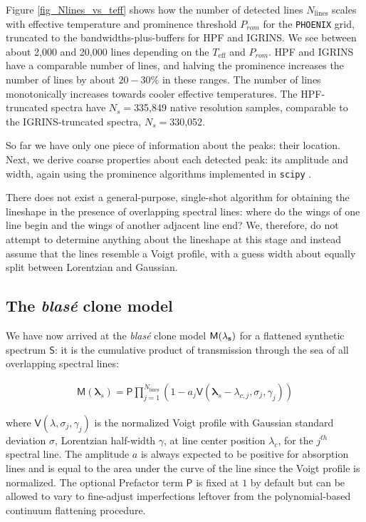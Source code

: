 \documentclass[modern]{aastex631}
\begin{document}
Figure \ref{fig_Nlines_vs_teff} shows how the number of detected lines $N_{\mathrm{lines}}$ scales with effective temperature and prominence threshold $P_{rom}$ for the \texttt{PHOENIX} grid, truncated to the bandwidths-plus-buffers for HPF and IGRINS. We see between about 2,000 and 20,000 lines depending on the $T_{\mathrm{eff}}$ and $P_{rom}$. HPF and IGRINS have a comparable number of lines, and halving the prominence increases the number of lines by about $20-30\%$ in these ranges. The number of lines monotonically increases towards cooler effective temperatures.
The HPF-truncated spectra have $N_s=$335,849 native resolution samples, comparable to the IGRINS-truncated spectra, $N_s=$330,052.

So far we have only one piece of information about the peaks: their location. Next, we derive coarse properties about each detected peak: its amplitude and width, again using the prominence algorithms implemented in \texttt{scipy} \citep{2020SciPy-NMeth}.

There does not exist a general-purpose, single-shot algorithm for obtaining the lineshape in the presence of overlapping spectral lines: where do the wings of one line begin and the wings of another adjacent line end? We, therefore, do not attempt to determine anything about the lineshape at this stage and instead assume that the lines resemble a Voigt profile, with a guess width about equally split between Lorentzian and Gaussian.

\subsection{The \emph{blas\'e} clone model}

We have now arrived at the \emph{blas\'e} clone model $\mathsf{M}(\bf{\lambda}_s)$ for a flattened synthetic spectrum $\mathsf{S}$: it is the cumulative product of transmission through the sea of all overlapping spectral lines:

\begin{eqnarray}
 \mathsf{M}(\bm{\lambda}_s) = {\displaystyle \mathsf{P} \prod_{j=1}^{N_{\mathrm{lines}}} (1-a_j \mathsf{V}(\bm{\lambda}_s-\lambda_{c,j}, \sigma_j, \gamma_j) )} \label{equation1}
\end{eqnarray}

where $\mathsf{V}(\lambda, \sigma_j, \gamma_j)$ is the normalized Voigt profile with Gaussian standard deviation $\sigma$, Lorentzian half-width $\gamma$, at line center position $\lambda_c$, for the $j^{th}$ spectral line. The amplitude $a$ is always expected to be positive for absorption lines and is equal to the area under the curve of the line since the Voigt profile is normalized. The optional Prefactor term $\mathsf{P}$ is fixed at $1$ by default but can be allowed to vary to fine-adjust imperfections leftover from the polynomial-based continuum flattening procedure.
\end{document}
